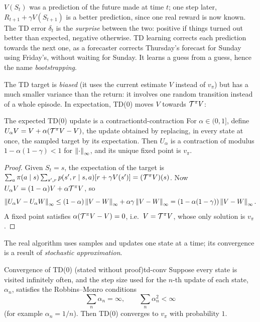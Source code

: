 \begin{intuition}
  $V(S_t)$ was a prediction of the future made at time $t$; one step later,
  $R_{t+1} + \gamma V(S_{t+1})$ is a better prediction, since one real
  reward is now known. The TD error $\delta_t$ is the \emph{surprise}
  between the two: positive if things turned out better than expected,
  negative otherwise. TD learning corrects each prediction towards the next
  one, as a forecaster corrects Thursday's forecast for Sunday using
  Friday's, without waiting for Sunday. It learns a guess from a guess,
  hence the name \emph{bootstrapping}.
\end{intuition}

The TD target is \emph{biased} (it uses the current estimate $V$ instead of
$v_\pi$) but has a much smaller variance than the return: it involves one
random transition instead of a whole episode. In expectation, TD(0) moves
$V$ towards $\mathcal{T}^\pi V$:

\begin{proposition}{The expected TD(0) update is a contraction}{td-contraction}
  For $\alpha \in (0, 1]$, define $U_\alpha V = V + \alpha (\mathcal{T}^\pi V - V)$,
  the update obtained by replacing, in every state at once, the sampled
  target by its expectation. Then $U_\alpha$ is a contraction of modulus
  $1 - \alpha (1 - \gamma) < 1$ for $\left\lVert \cdot \right\rVert_\infty$, and its unique
  fixed point is $v_\pi$.
\end{proposition}

\begin{proof}
  Given $S_t = s$, the expectation of the target is $\sum_a \pi(a \mid s)
  \sum_{s', r} p(s', r \mid s, a) [r + \gamma V(s')] = (\mathcal{T}^\pi V)(s)$.
  Now $U_\alpha V = (1 - \alpha) V + \alpha \mathcal{T}^\pi V$, so
  \begin{equation*}
    \left\lVert U_\alpha V - U_\alpha W \right\rVert_\infty
    \leq (1 - \alpha) \left\lVert V - W \right\rVert_\infty + \alpha \gamma \left\lVert V -
      W \right\rVert_\infty
    = \left(1 - \alpha (1 - \gamma)\right) \left\lVert V - W \right\rVert_\infty.
  \end{equation*}
  A fixed point satisfies $\alpha (\mathcal{T}^\pi V - V) = 0$, i.e.\ $V = \mathcal{T}^\pi
  V$, whose only solution is $v_\pi$.
\end{proof}

The real algorithm uses samples and updates one state at a time; its
convergence is a result of \emph{stochastic approximation}.

\begin{theorem}{Convergence of TD(0) (stated without proof)}{td-conv}
  Suppose every state is visited infinitely often, and the step size used
  for the $n$-th update of each state, $\alpha_n$, satisfies the
  Robbins--Monro conditions
  \begin{equation}
    \label{eq:robbins-monro}
    \sum_{n} \alpha_n = \infty, \qquad \sum_{n} \alpha_n^2 < \infty
  \end{equation}
  (for example $\alpha_n = 1/n$). Then TD(0) converges to $v_\pi$ with
  probability $1$.
\end{theorem}

